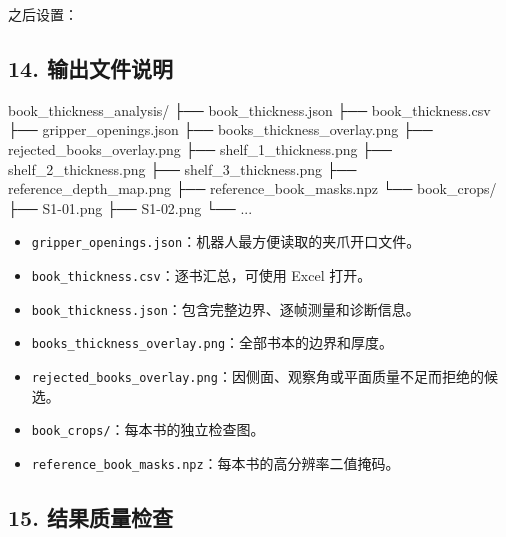 \documentclass[
  chinese,
  11pt,
  a4paper,
]{article}
\newenvironment{Shaded}{\begin{snugshade}}{\end{snugshade}}
\newcommand{\BuiltInTok}[1]{#1}
\newcommand{\NormalTok}[1]{#1}
\newcommand{\OperatorTok}[1]{\textcolor[rgb]{0.81,0.36,0.00}{\textbf{#1}}}
\newcommand{\VariableTok}[1]{\textcolor[rgb]{0.00,0.00,0.00}{#1}}
\providecommand{\tightlist}{%
  \setlength{\itemsep}{0pt}\setlength{\parskip}{0pt}}
\begin{document}
之后设置：

\begin{Shaded}
\end{Shaded}

\subsection{14.
输出文件说明}\label{14-ux8f93ux51faux6587ux4ef6ux8bf4ux660e}

\begin{Shaded}
\begin{Highlighting}[]
\NormalTok{book\_thickness\_analysis/}
\NormalTok{├── book\_thickness.json}
\NormalTok{├── book\_thickness.csv}
\NormalTok{├── gripper\_openings.json}
\NormalTok{├── books\_thickness\_overlay.png}
\NormalTok{├── rejected\_books\_overlay.png}
\NormalTok{├── shelf\_1\_thickness.png}
\NormalTok{├── shelf\_2\_thickness.png}
\NormalTok{├── shelf\_3\_thickness.png}
\NormalTok{├── reference\_depth\_map.png}
\NormalTok{├── reference\_book\_masks.npz}
\NormalTok{└── book\_crops/}
\NormalTok{    ├── S1{-}01.png}
\NormalTok{    ├── S1{-}02.png}
\NormalTok{    └── ...}
\end{Highlighting}
\end{Shaded}

\begin{itemize}
\tightlist
\item
  \texttt{gripper\_openings.json}：机器人最方便读取的夹爪开口文件。
\item
  \texttt{book\_thickness.csv}：逐书汇总，可使用 Excel 打开。
\item
  \texttt{book\_thickness.json}：包含完整边界、逐帧测量和诊断信息。
\item
  \texttt{books\_thickness\_overlay.png}：全部书本的边界和厚度。
\item
  \texttt{rejected\_books\_overlay.png}：因侧面、观察角或平面质量不足而拒绝的候选。
\item
  \texttt{book\_crops/}：每本书的独立检查图。
\item
  \texttt{reference\_book\_masks.npz}：每本书的高分辨率二值掩码。
\end{itemize}

\subsection{15.
结果质量检查}\label{15-ux7ed3ux679cux8d28ux91cfux68c0ux67e5}
\end{document}
